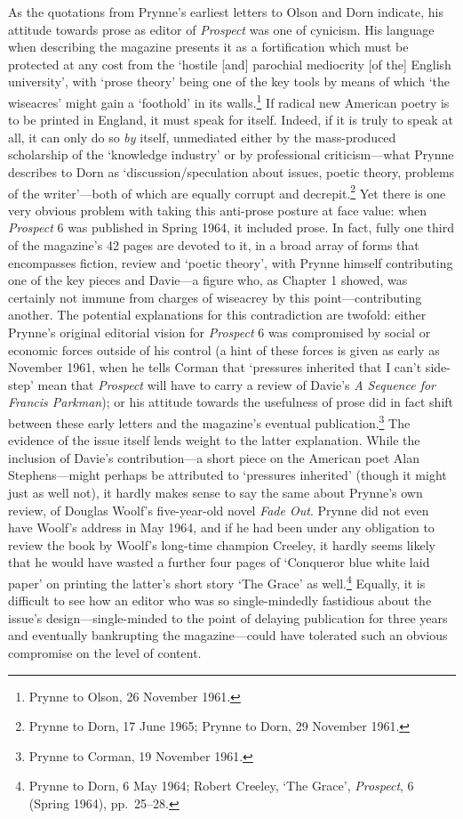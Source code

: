 \documentclass[]{article}
\begin{document}
As the quotations from Prynne’s earliest letters to Olson and Dorn
indicate, his attitude towards prose as editor of \emph{Prospect} was
one of cynicism. His language when describing the magazine presents it
as a fortification which must be protected at any cost from the ‘hostile
{[}and{]} parochial mediocrity {[}of the{]} English university’, with
‘prose theory’ being one of the key tools by means of which ‘the
wiseacres’ might gain a ‘foothold’ in its walls.\footnote{Prynne to
  Olson, 26 November 1961.} If radical new American poetry is to be
printed in England, it must speak for itself. Indeed, if it is truly to
speak at all, it can only do so \emph{by} itself, unmediated either by
the mass-produced scholarship of the ‘knowledge industry’ or by
professional criticism—what Prynne describes to Dorn as
‘discussion/speculation about issues, poetic theory, problems of the
writer’—both of which are equally corrupt and decrepit.\footnote{Prynne
  to Dorn, 17 June 1965; Prynne to Dorn, 29 November 1961.} Yet there is
one very obvious problem with taking this anti-prose posture at face
value: when \emph{Prospect} 6 was published in Spring 1964, it included
prose. In fact, fully one third of the magazine’s 42 pages are devoted
to it, in a broad array of forms that encompasses fiction, review and
‘poetic theory’, with Prynne himself contributing one of the key pieces
and Davie—a figure who, as Chapter 1 showed, was certainly not immune
from charges of wiseacrey by this point—contributing another. The
potential explanations for this contradiction are twofold: either
Prynne’s original editorial vision for \emph{Prospect} 6 was compromised
by social or economic forces outside of his control (a hint of these
forces is given as early as November 1961, when he tells Corman that
‘pressures inherited that I can’t side-step’ mean that \emph{Prospect}
will have to carry a review of Davie’s \emph{A Sequence for Francis
Parkman}); or his attitude towards the usefulness of prose did in fact
shift between these early letters and the magazine’s eventual
publication.\footnote{Prynne to Corman, 19 November 1961.} The evidence
of the issue itself lends weight to the latter explanation. While the
inclusion of Davie’s contribution—a short piece on the American poet
Alan Stephens—might perhaps be attributed to ‘pressures inherited’
(though it might just as well not), it hardly makes sense to say the
same about Prynne’s own review, of Douglas Woolf’s five-year-old novel
\emph{Fade Out}. Prynne did not even have Woolf’s address in May 1964,
and if he had been under any obligation to review the book by Woolf’s
long-time champion Creeley, it hardly seems likely that he would have
wasted a further four pages of ‘Conqueror blue white laid paper’ on
printing the latter’s short story ‘The Grace’ as well.\footnote{Prynne
  to Dorn, 6 May 1964; Robert Creeley, ‘The Grace’, \emph{Prospect}, 6
  (Spring 1964), pp.~25–28.} Equally, it is difficult to see how an
editor who was so single-mindedly fastidious about the issue’s
design—single-minded to the point of delaying publication for three
years and eventually bankrupting the magazine—could have tolerated such
an obvious compromise on the level of content.
\end{document}

